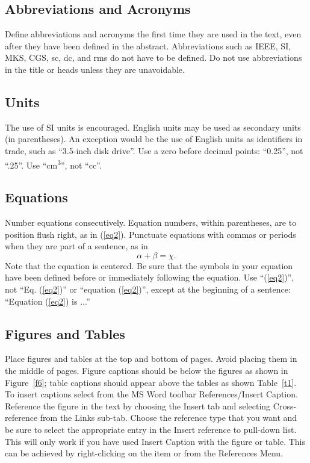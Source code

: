 \documentclass{wsecapstone}
\begin{document}
\subsection{Abbreviations and Acronyms}
Define abbreviations and acronyms the first time they are used in the text, even after they have been defined in the abstract. Abbreviations such as IEEE, SI, MKS, CGS, sc, dc, and rms do not have to be defined. Do not use abbreviations in the title or heads unless they are unavoidable.

\subsection{Units}
The use of SI units is encouraged. English units may be used as secondary units (in parentheses). An exception would be the use of English units as identifiers in trade, such as ``3.5-inch disk drive''. Use a zero before decimal points: ``0.25'', not ``.25''. Use ``\si{\centi\meter\cubed}'', not ``cc''. 

\subsection{Equations}
Number equations consecutively. Equation numbers, within parentheses, are to position flush right, as in (\ref{eq2}). Punctuate equations with commas or periods when they are part of a sentence, as in
\begin{equation}
\alpha + \beta = \chi.
\label{eq2}
\end{equation}
Note that the equation is centered. Be sure that the symbols in your equation have been defined before or immediately following the equation. Use ``(\ref{eq2})'', not ``Eq. (\ref{eq2})'' or ``equation (\ref{eq2})'', except at the beginning of a sentence: ``Equation (\ref{eq2}) is ...''

\subsection{Figures and Tables}
Place figures and tables at the top and bottom of pages. Avoid placing them in the middle of pages. Figure captions should be below the figures as shown in Figure~\ref{f6}; table captions should appear above the tables as shown Table~\ref{t1}. To insert captions select from the MS Word toolbar References/Insert Caption.  Reference the figure in the text by choosing the Insert tab and selecting Cross-reference from the Links sub-tab.  Choose the reference type that you want and be sure to select the appropriate entry in the Insert reference to pull-down list.  This will only work if you have used Insert Caption with the figure or table. This can be achieved by right-clicking on the item or from the References Menu.
\end{document}
